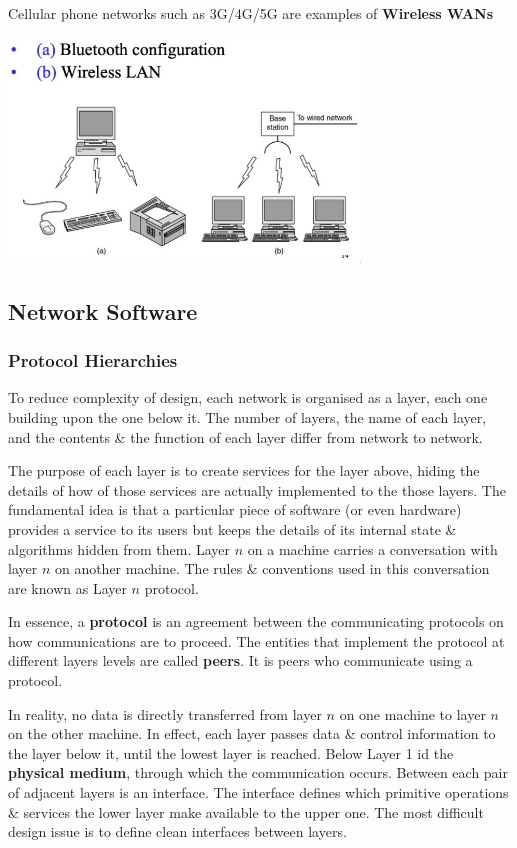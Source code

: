 \documentclass[11pt]{article}
\begin{document}
Cellular phone networks such as 3G/4G/5G are examples of \textbf{Wireless WANs} 

\begin{center}
    \includegraphics[width=0.7\textwidth]{wlan.png}
\end{center}

\subsection{Network Software}
\subsubsection{Protocol Hierarchies}
To reduce complexity of design, each network is organised as a layer, each one building upon the one below it.
The number of layers, the name of each layer, and the contents \& the function of each layer differ from network to network.

The purpose of each layer is to create services for the layer above, hiding the details of how of those services are actually 
implemented to the those layers. 
The fundamental idea is that a particular piece of software (or even hardware) provides a service to its users but keeps the 
details of its internal state \& algorithms hidden from them. 
Layer $n$ on a machine carries a conversation with layer $n$ on another machine. 
The rules \& conventions used in this conversation are known as Layer $n$ protocol. 

In essence, a \textbf{protocol} is an agreement between the communicating protocols on how communications are to proceed. 
The entities that implement the protocol at different layers levels are called \textbf{peers}. 
It is peers who communicate using a protocol. 

In reality, no data is directly transferred from layer $n$ on one machine to layer $n$ on the other machine. 
In effect, each layer passes data \& control information to the layer below it, until the lowest layer is reached. 
Below Layer 1 id the \textbf{physical medium}, through which the communication occurs. 
Between each pair of adjacent layers is an interface. 
The interface defines which primitive operations \& services the lower layer make available to the upper one.
The most difficult design issue is to define clean interfaces between layers. 
\end{document}
